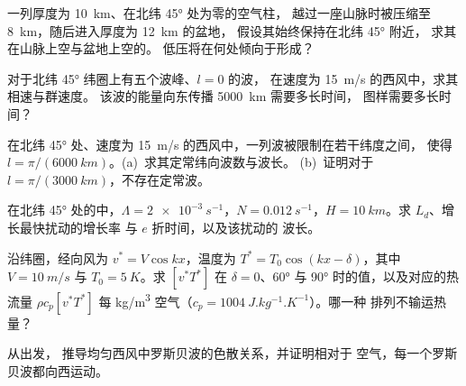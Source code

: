 \begin{exercise}[$\star\star$]\label{exo:b3:atmospheric-dynamics:5}
一列厚度为 \qty{10}{km}、在北纬 \ang{45} 处为零的空气柱，
越过一座山脉时被压缩至 \qty{8}{km}，随后进入厚度为 \qty{12}{km} 的盆地，
假设其始终保持在北纬 \ang{45} 附近，
求其在山脉上空与盆地上空的。
低压将在何处倾向于形成？
\end{exercise}

\begin{exercise}[$\star\star$]\label{exo:b3:atmospheric-dynamics:6}
对于北纬 \ang{45} 纬圈上有五个波峰、$l = 0$ 的波，
在速度为 \qty{15}{m/s} 的西风中，求其相速与群速度。
该波的能量向东传播 \qty{5000}{km} 需要多长时间，
图样需要多长时间？
\end{exercise}

\begin{exercise}[$\star\star$]\label{exo:b3:atmospheric-dynamics:7}
在北纬 \ang{45} 处、速度为 \qty{15}{m/s} 的西风中，一列波被限制在若干纬度之间，
使得 $l = \pi/(\qty{6000}{km})$。(a)~求其定常纬向波数与波长。
(b)~证明对于
$l = \pi/(\qty{3000}{km})$，不存在定常波。
\end{exercise}

\begin{exercise}[$\star\star$]\label{exo:b3:atmospheric-dynamics:8}
在北纬 \ang{45} 处的中，$\Lambda = \qty{2e-3}{s^{-1}}$，$N =
\qty{0.012}{s^{-1}}$，$H = \qty{10}{km}$。求 $L_d$、增长最快扰动的增长率
与 $e$ 折时间，以及该扰动的
波长。
\end{exercise}

\begin{exercise}[$\star\star$]\label{exo:b3:atmospheric-dynamics:9}
沿纬圈，经向风为 $v^* = V\cos kx$，温度为
$T^* = T_0\cos(kx - \delta)$，其中 $V = \qty{10}{m/s}$ 与
$T_0 = \qty{5}{K}$。求 $[v^*T^*]$ 在 $\delta = 0$、\ang{60} 与
\ang{90} 时的值，以及对应的热流量 $\rho c_p[v^*T^*]$
每 \unit{kg/m^3} 空气（$c_p = \qty{1004}{J.kg^{-1}.K^{-1}}$）。哪一种
排列不输运热量？
\end{exercise}

\begin{exercise}[$\star\star\star$]\label{exo:b3:atmospheric-dynamics:10}
从出发，
推导均匀西风中罗斯贝波的色散关系，并证明相对于
空气，每一个罗斯贝波都向西运动。
\end{exercise}

